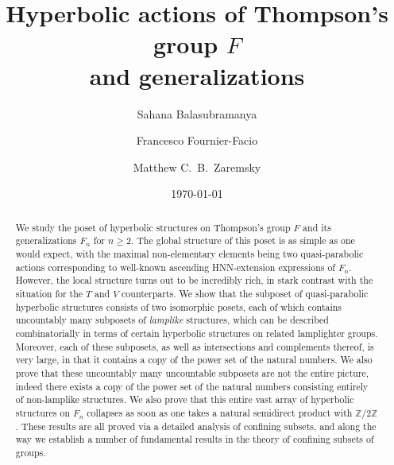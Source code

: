 \documentclass[reqno,12pt]{amsart}\setcounter{tocdepth}{1}
\theoremstyle{definition}
\newcommand{\Z}{\mathbb{Z}}
\numberwithin{equation}{section}
\begin{document}
\title[Hyperbolic actions of Thompson's group $F$ and generalizations]{Hyperbolic actions of Thompson's group $F$ \\ and generalizations}
\date{\today}


\author[S.~Balasubramanya]{Sahana Balasubramanya}
\address{Department of Mathematical Sciences, Lafayette College, Easton, PA, USA}

\author[F.~Fournier-Facio]{Francesco Fournier-Facio}
\address{Department of Pure Mathematics and Mathematical Statistics, University of Cambridge, UK}

\author[M.~C.~B.~Zaremsky]{Matthew C.~B.~Zaremsky}
\address{Department of Mathematics and Statistics, University at Albany (SUNY), Albany, NY, USA}

\begin{abstract}
We study the poset of hyperbolic structures on Thompson's group $F$ and its generalizations $F_n$ for $n \geq 2$.
The global structure of this poset is as simple as one would expect, with the maximal non-elementary elements being two quasi-parabolic actions corresponding to well-known ascending HNN-extension expressions of $F_n$. However, the local structure turns out to be incredibly rich, in stark contrast with the situation for the $T$ and $V$ counterparts.
We show that the subposet of quasi-parabolic hyperbolic structures consists of two isomorphic posets, each of which contains uncountably many subposets of \emph{lamplike} structures, which can be described combinatorially in terms of certain hyperbolic structures on related lamplighter groups.
Moreover, each of these subposets, as well as intersections and complements thereof, is very large, in that it contains a copy of the power set of the natural numbers.
We also prove that these uncountably many uncountable subposets are not the entire picture, indeed there exists a copy of the power set of the natural numbers consisting entirely of non-lamplike structures.
We also prove that this entire vast array of hyperbolic structures on $F_n$ collapses as soon as one takes a natural semidirect product with $\Z/2\Z$. These results are all proved via a detailed analysis of confining subsets, and along the way we establish a number of fundamental results in the theory of confining subsets of groups.
\end{abstract}
\end{document}
